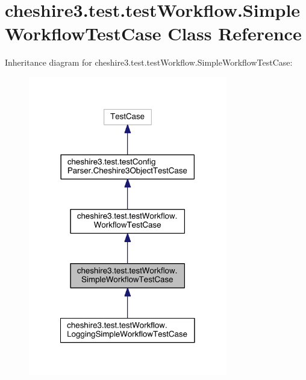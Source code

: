 \hypertarget{classcheshire3_1_1test_1_1test_workflow_1_1_simple_workflow_test_case}{\section{cheshire3.\-test.\-test\-Workflow.\-Simple\-Workflow\-Test\-Case Class Reference}
\label{classcheshire3_1_1test_1_1test_workflow_1_1_simple_workflow_test_case}
}


Inheritance diagram for cheshire3.\-test.\-test\-Workflow.\-Simple\-Workflow\-Test\-Case\-:
\nopagebreak
\begin{figure}[H]
\begin{center}
\leavevmode
\includegraphics[width=246pt]{classcheshire3_1_1test_1_1test_workflow_1_1_simple_workflow_test_case__inherit__graph}
\end{center}
\end{figure}


